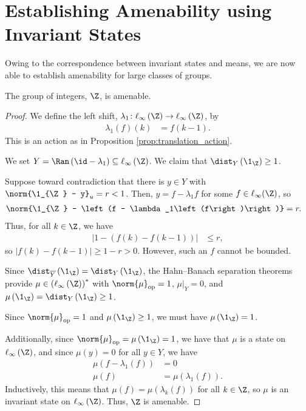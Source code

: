 \section{Establishing Amenability using Invariant States}\label{sec:amenability_invariant_states}%
Owing to the correspondence between invariant states and means, we are now able to establish amenability for large classes of groups.
\begin{proposition}
  The group of integers, $\Z$, is amenable.
\end{proposition}
\begin{proof}
  We define the left shift, $\lambda_1\colon \ell_{\infty}\left(\Z\right) \rightarrow \ell_{\infty}\left(\Z\right)$, by
  \begin{align*}
    \lambda_1\left(f\right)\left(k\right) &= f\left(k-1\right).
  \end{align*}
  This is an action as in Proposition \ref{prop:translation_action}. \newline

  We set $Y = \Ran\left(\id - \lambda_1\right)\subseteq \ell_{\infty}\left(\Z\right)$. We claim that $\dist_{Y}\left(\1_{\Z}\right) \geq 1$.\newline

  Suppose toward contradiction that there is $y\in Y$ with $\norm{\1_{\Z} - y}_{u} = r < 1$. Then, $y = f - \lambda_1 f$ for some $f\in \ell_{\infty}(\Z)$, so
  \begin{align*}
    \norm{\1_{\Z} - \left(f - \lambda_1\left(f\right)\right)} &= r.
  \end{align*}
  Thus, for all $k\in\Z$, we have
  \begin{align*}
    \left\vert 1 - \left(f(k) - f(k-1)\right) \right\vert &\leq r,
  \end{align*}
  so $\left\vert f(k) - f\left(k-1\right) \right\vert \geq 1-r > 0$. However, such an $f$ cannot be bounded.\newline

  Since $\dist_{\overline{Y}}\left(\1_{\Z}\right) = \dist_{Y}\left(\1_{\Z}\right)$, the Hahn--Banach separation theorems provide $\mu\in \left(\ell_{\infty}\left(\Z\right)\right)^{\ast}$ with $\norm{\mu}_{\op} = 1$, $\mu|_{\overline{Y}} = 0$, and $\mu\left(\1_{\Z}\right) = \dist_{Y}\left(\1_{\Z}\right) \geq 1$.\newline

  Since $\norm{\mu}_{\op} = 1$ and $\mu\left(\1_{\Z}\right) \geq 1$, we must have $\mu\left(\1_{\Z}\right) = 1$.\newline

  Additionally, since $\norm{\mu}_{\op} = \mu\left(\1_{\Z}\right) = 1$, we have that $\mu$ is a state on $\ell_{\infty}\left(\Z\right)$, and since $\mu\left(y\right) = 0$ for all $y\in Y$, we have
  \begin{align*}
    \mu\left(f - \lambda_1\left(f\right)\right) &= 0\\
    \mu\left(f\right) &= \mu\left(\lambda_1\left(f\right)\right).
  \end{align*}
  Inductively, this means that $\mu\left(f\right) = \mu\left(\lambda_k\left(f\right)\right)$ for all $k\in \Z$, so $\mu$ is an invariant state on $\ell_{\infty}\left(\Z\right)$. Thus, $\Z$ is amenable.
\end{proof}
